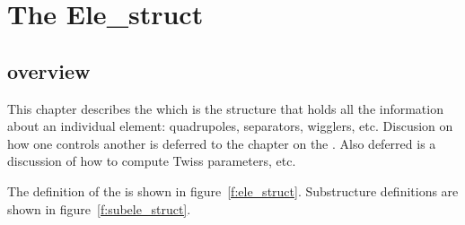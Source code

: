 \chapter{The Ele\_struct}
\section{overview}

This chapter describes the  which is the structure that
holds all the information about an individual element: quadrupoles,
separators, wigglers, etc. Discusion on how one  controls
another is deferred to the chapter on the . Also deferred
is a discussion of how to compute Twiss parameters, etc.

The definition of the  is shown
in figure~\ref{f:ele_struct}. Substructure definitions are shown in
figure~\ref{f:subele_struct}. 

